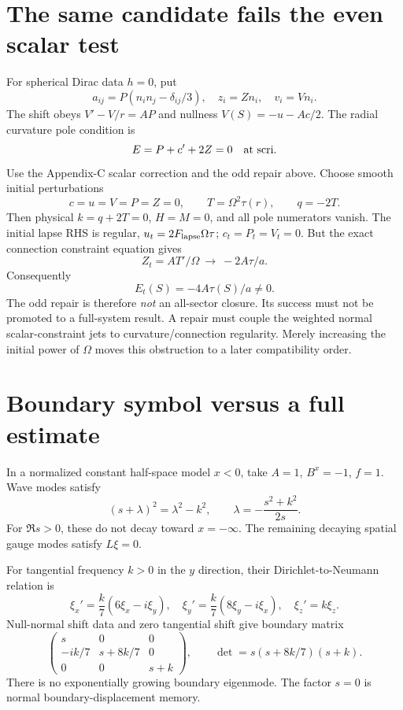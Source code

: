\documentclass[11pt]{article}
\begin{document}
\section{The same candidate fails the even scalar test}
For spherical Dirac data $h=0$, put
\[
a_{ij}=P(n_in_j-\delta_{ij}/3),\quad z_i=Zn_i,\quad v_i=Vn_i .
\]
The shift obeys $V'-V/r=AP$ and nullness
$V(S)=-u-Ac/2$. The radial curvature pole condition is
\[
E=P+c'+2Z=0\quad\hbox{at scri}.
\]
Use the Appendix-C scalar correction and the odd repair above.
Choose smooth initial perturbations
\[
c=u=V=P=Z=0,\qquad T=\Omega^2\tau(r),\qquad q=-2T .
\]
Then physical $k=q+2T=0$, $H=M=0$, and all pole numerators vanish.
The initial lapse RHS is regular, $u_t=2F_{\rm lapse}\Omega\tau$;
$c_t=P_t=V_t=0$. But the exact connection constraint equation gives
\[
Z_t=A T'/\Omega\ \longrightarrow\ -2A\tau/a.
\]
Consequently
\begin{equation}\boxed{E_t(S)=-4A\tau(S)/a\ne0.}\end{equation}
The odd repair is therefore \emph{not} an all-sector closure. Its
success must not be promoted to a full-system result.
A repair must couple the weighted normal scalar-constraint jets to
curvature/connection regularity. Merely increasing the initial power
of $\Omega$ moves this obstruction to a later compatibility order.

\section{Boundary symbol versus a full estimate}
In a normalized constant half-space model $x<0$, take $A=1$, $B^x=-1$, $f=1$. Wave modes satisfy
\[
(s+\lambda)^2=\lambda^2-k^2,\qquad
\lambda=-\frac{s^2+k^2}{2s}.
\]
For $\Re s>0$, these do not decay toward $x=-\infty$. The remaining decaying spatial gauge modes satisfy $L\xi=0$.

For tangential frequency $k>0$ in the $y$ direction, their Dirichlet-to-Neumann relation is
\[
\xi_x'=\frac{k}{7}(6\xi_x-i\xi_y),\quad
\xi_y'=\frac{k}{7}(8\xi_y-i\xi_x),\quad \xi_z'=k\xi_z .
\]
Null-normal shift data and zero tangential shift give boundary matrix
\[
\begin{pmatrix}
s&0&0\\-ik/7&s+8k/7&0\\0&0&s+k
\end{pmatrix},
\qquad
\det=s(s+8k/7)(s+k).
\]
There is no exponentially growing boundary eigenmode. The factor $s=0$ is normal boundary-displacement memory.
\end{document}
